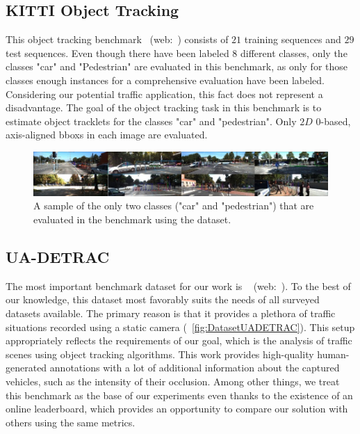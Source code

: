\subsection{KITTI Object Tracking}
\label{ssec:DatasetKITTIObjectTracking}

This object tracking benchmark~\cite{geiger2012cvpr} (web:~\cite{webkittiobjtrackingdataset}) consists of $21$ training sequences and $29$ test sequences. Even though there have been labeled $8$ different classes, only the classes "car" and "Pedestrian" are evaluated in this benchmark, as only for those classes enough instances for a comprehensive evaluation have been labeled. Considering our potential traffic application, this fact does not represent a disadvantage. The goal of the object tracking task in this benchmark is to estimate object tracklets for the classes "car" and "pedestrian". Only $2D$ $0$-based, axis-aligned \glspl{bbox} in each image are evaluated.

\begin{figure}[t]
    \centerline{\includegraphics[width=\linewidth]{figures/datasets/kitti_object_tracking_sample.jpg}}
    \caption[ dataset]{A sample of the only two classes ("car" and "pedestrian") that are evaluated in the benchmark using the  dataset. }
    \label{fig:DatasetKITTIObjectTracking}
\end{figure}

\subsection{UA-DETRAC}
\label{ssec:DatasetUADETRAC}

The most important benchmark dataset for our work is \uadetrac{}~\cite{wen2020uadetrac} (web:~\cite{webuadetracdataset}). To the best of our knowledge, this dataset most favorably suits the needs of all surveyed datasets available. The primary reason is that it provides a plethora of traffic situations recorded using a static camera (\figtext{}~\ref{fig:DatasetUADETRAC}). This setup appropriately reflects the requirements of our goal, which is the analysis of traffic scenes using object tracking algorithms. This work provides high-quality human-generated annotations with a lot of additional information about the captured vehicles, such as the intensity of their occlusion. Among other things, we treat this benchmark as the base of our experiments even thanks to the existence of an online leaderboard, which provides an opportunity to compare our solution with others using the same metrics.

